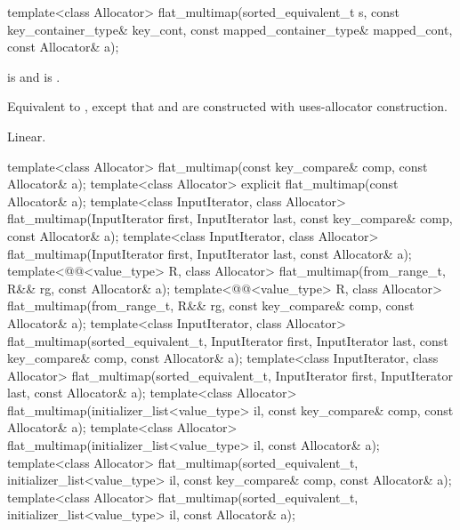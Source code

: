 %
\begin{itemdecl}
template<class Allocator>
  flat_multimap(sorted_equivalent_t s, const key_container_type& key_cont,
                const mapped_container_type& mapped_cont, const Allocator& a);
\end{itemdecl}

\begin{itemdescr}
\pnum
\constraints
{} is  and
 is .

\pnum
\effects
Equivalent to ,
except that  and  are constructed
with uses-allocator construction.

\pnum
\complexity
Linear.
\end{itemdescr}

%
\begin{itemdecl}
template<class Allocator>
  flat_multimap(const key_compare& comp, const Allocator& a);
template<class Allocator>
  explicit flat_multimap(const Allocator& a);
template<class InputIterator, class Allocator>
  flat_multimap(InputIterator first, InputIterator last, const key_compare& comp,
                const Allocator& a);
template<class InputIterator, class Allocator>
  flat_multimap(InputIterator first, InputIterator last, const Allocator& a);
template<@@<value_type> R, class Allocator>
  flat_multimap(from_range_t, R&& rg, const Allocator& a);
template<@@<value_type> R, class Allocator>
  flat_multimap(from_range_t, R&& rg, const key_compare& comp, const Allocator& a);
template<class InputIterator, class Allocator>
  flat_multimap(sorted_equivalent_t, InputIterator first, InputIterator last,
                const key_compare& comp, const Allocator& a);
template<class InputIterator, class Allocator>
  flat_multimap(sorted_equivalent_t, InputIterator first, InputIterator last,
                const Allocator& a);
template<class Allocator>
  flat_multimap(initializer_list<value_type> il, const key_compare& comp, const Allocator& a);
template<class Allocator>
  flat_multimap(initializer_list<value_type> il, const Allocator& a);
template<class Allocator>
  flat_multimap(sorted_equivalent_t, initializer_list<value_type> il,
                const key_compare& comp, const Allocator& a);
template<class Allocator>
  flat_multimap(sorted_equivalent_t, initializer_list<value_type> il, const Allocator& a);
\end{itemdecl}

